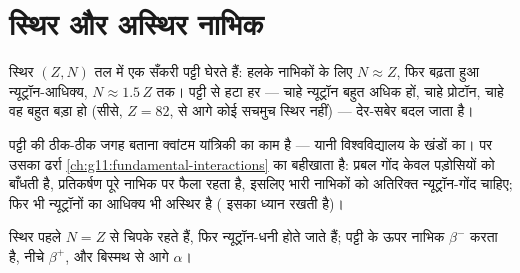 \section{स्थिर और अस्थिर नाभिक}

\begin{proposition}[स्थिरता की घाटी]\label{prop:g11:nucleus-radioactivity:valley}
स्थिर  $(Z, N)$ तल में एक सँकरी पट्टी घेरते हैं: हलके
नाभिकों के लिए $N \approx Z$, फिर बढ़ता हुआ न्यूट्रॉन-आधिक्य, $N \approx 1.5\,Z$ तक। पट्टी से
हटा हर  --- चाहे न्यूट्रॉन बहुत अधिक हों, चाहे प्रोटॉन,
चाहे वह बहुत बड़ा हो (सीसे, $Z = 82$, से आगे कोई  सचमुच स्थिर
नहीं) --- देर-सबेर बदल जाता है।
\end{proposition}
\admitted

\begin{remark}
पट्टी की ठीक-ठीक जगह बताना क्वांटम यांत्रिकी का काम है --- यानी विश्वविद्यालय
के खंडों का। पर उसका ढर्रा \cref{ch:g11:fundamental-interactions} का बहीखाता है: प्रबल गोंद केवल पड़ोसियों को
बाँधती है,  प्रतिकर्षण पूरे नाभिक पर फैला रहता है, इसलिए भारी
नाभिकों को अतिरिक्त न्यूट्रॉन-गोंद चाहिए; फिर भी न्यूट्रॉनों का आधिक्य भी
अस्थिर है ( इसका ध्यान रखती है)।
\end{remark}

\begin{omfigure}

{\small स्थिर  पहले $N = Z$ से चिपके रहते हैं, फिर
न्यूट्रॉन-धनी होते जाते हैं; पट्टी के ऊपर नाभिक $\beta^-$  करता है,
नीचे $\beta^+$, और बिस्मथ से आगे $\alpha$।}
\end{omfigure}

